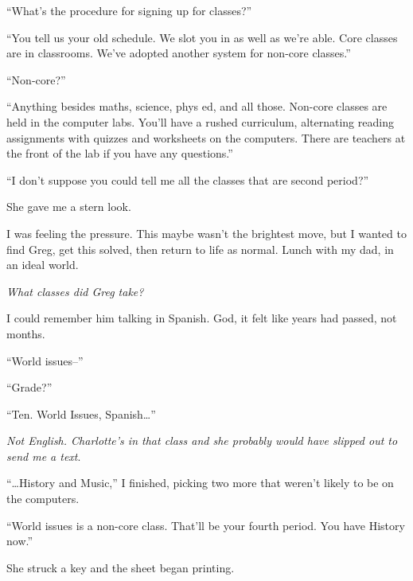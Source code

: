 ``What's the procedure for signing up for classes?''



``You tell us your old schedule.  We slot you in as well as we're able.  Core classes are in classrooms.  We've adopted another system for non-core classes.''



``Non-core?''



``Anything besides maths, science, phys ed, and all those.  Non-core classes are held in the computer labs.  You'll have a rushed curriculum, alternating reading assignments with quizzes and worksheets on the computers.  There are teachers at the front of the lab if you have any questions.''



``I don't suppose you could tell me all the classes that are second period?''



She gave me a stern look.



I was feeling the pressure.  This maybe wasn't the brightest move, but I wanted to find Greg, get this solved, then return to life as normal.  Lunch with my dad, in an ideal world.



\emph{What classes did Greg take?}



I could remember him talking in Spanish.  God, it felt like years had passed, not months.



``World issues--''



``Grade?''



``Ten.  World Issues, Spanish\ldots''



\emph{Not English.  Charlotte's in that class and she probably would have slipped out to send me a text}.



``\ldots{}History and Music,'' I finished, picking two more that weren't likely to be on the computers.



``World issues is a non-core class.  That'll be your fourth period.  You have History now.''



She struck a key and the sheet began printing.



